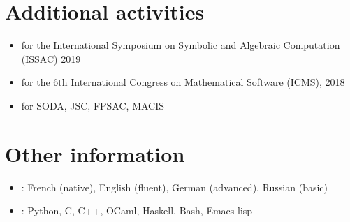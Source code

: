 \documentclass{scrartcl}
\begin{document}
\section*{Additional activities}

\begin{itemize}
  \item {} for the International Symposium on Symbolic and Algebraic Computation (ISSAC) 2019
  \item {} for the 6th International Congress on Mathematical Software (ICMS), 2018
  \item {} for SODA, JSC, FPSAC, MACIS
\end{itemize}

\section*{Other information}

\begin{itemize}
  \item {}: French (native), English (fluent), German (advanced), Russian (basic)
  \item {}: Python, C, C++, OCaml, Haskell, Bash, Emacs lisp
\end{itemize}

\end{document}

